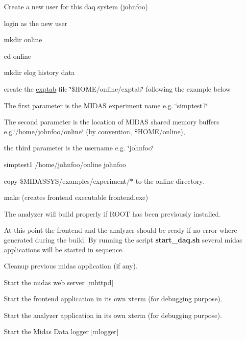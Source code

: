 \begin{DoxyItemize}
\item Create a new user for this daq system (johnfoo)
\item login as the new user
\item mkdir online
\item cd online
\item mkdir elog history data
\item create the \hyperlink{Q_Linux_Q_Linux_Exptab}{exptab} file \char`\"{}\$HOME/online/exptab\char`\"{} following the example below
\begin{DoxyItemize}
\item The first parameter is the MIDAS experiment name e.g. \char`\"{}simptest1\char`\"{}
\item The second parameter is the location of MIDAS shared memory buffers e.g.\char`\"{}/home/johnfoo/online\char`\"{} (by convention, \$HOME/online),
\item the third parameter is the username e.g. \char`\"{}johnfoo\char`\"{} 
\begin{DoxyCode}
  simptest1 /home/johnfoo/online johnfoo
\end{DoxyCode}
 \label{RC_customize_ODB_start-all}
\hypertarget{RC_customize_ODB_start-all}{}

\end{DoxyItemize}
\item copy \$MIDASSYS/examples/experiment/$\ast$ to the online directory.
\item make (creates frontend executable frontend.exe) 

\item The analyzer will build properly if ROOT has been previously installed.
\item At this point the frontend and the analyzer should be ready if no error where generated during the build. By running the script {\bfseries  start\_\-daq.sh } several midas applications will be started in sequence.
\begin{DoxyEnumerate}
\item Cleanup previous midas application (if any).
\item Start the midas web server \mbox{[}mhttpd\mbox{]}
\item Start the frontend application in its own xterm (for debugging purpose).
\item Start the analyzer application in its own xterm (for debugging purpose).
\item Start the Midas Data logger \mbox{[}mlogger\mbox{]}
\end{DoxyEnumerate}
\end{DoxyItemize}


